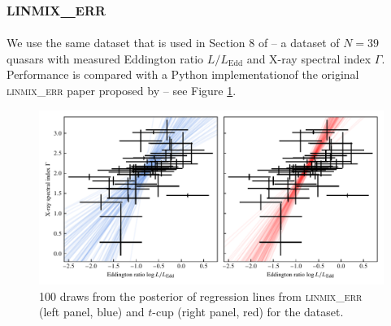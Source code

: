 \documentclass[fleqn,usenatbib]{rasti}
\begin{document}
\subsection{\textsc{linmix\_err}}

We use the same dataset that is used in Section 8 of \citet{Kelly:2007} -- a
dataset of $N = 39$ quasars with measured Eddington ratio $L / L_{\text{Edd}}$
and X-ray spectral index $\Gamma$. Performance is compared with a Python
implementation\footnotemark of the original \textsc{linmix\_err} paper proposed
by \citeauthor{Kelly:2007} -- see Figure \ref{fig:real-world.kelly.regression}.


\begin{figure}
    \includegraphics[width=\linewidth]{graphics/real/regression_kelly.pdf}
    \caption{100 draws from the posterior of regression lines from
    \textsc{linmix\_err} (left panel, blue) and $t$-cup (right panel, red) for
    the \citet{Kelly:2007} dataset.}
    \label{fig:real-world.kelly.regression}
\end{figure}
\end{document}
